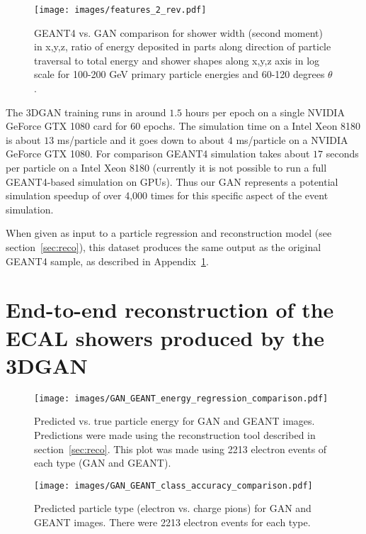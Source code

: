 \begin{figure}
    \centering
    \texttt{[image: images/features\_2\_rev.pdf]}
    \caption{GEANT4 vs. GAN comparison for shower width (second
      moment) in x,y,z, ratio of energy deposited in parts along
      direction of particle traversal to total energy and shower
      shapes along x,y,z axis in log scale for 100-200 GeV primary
      particle energies and 60-120 degrees $\theta$.
      \label{fig:GAN_features2}}
\end{figure}

The 3DGAN training runs in around $1.5$ hours per epoch on a single NVIDIA GeForce GTX 1080 card for $60$ epochs. The simulation  time  on a Intel  Xeon 8180  is about $13$ ms/particle  and it goes down to about $4$ ms/particle on a NVIDIA  GeForce  GTX  1080. For  comparison  GEANT4  simulation takes  about $17$ seconds  per  particle on  a  Intel  Xeon  8180 (currently  it  is  not  possible  to  run a full  GEANT4-based  simulation  on  GPUs). Thus our GAN represents a potential simulation speedup of over 4,000 times for this specific aspect of the event simulation.

When given as input to a particle regression and reconstruction model (see section~\ref{sec:reco}), this dataset produces the same output as the original GEANT4 sample, as described in Appendix~\ref{appendix:RECO_on_GAN}.

\section{End-to-end reconstruction of the ECAL showers produced by the 3DGAN}
\label{appendix:RECO_on_GAN}

\begin{figure}
    \centering
    \texttt{[image: images/GAN\_GEANT\_energy\_regression\_comparison.pdf]}
    \caption{Predicted vs. true particle energy for GAN and GEANT
      images. Predictions were made using the reconstruction tool described in section~\ref{sec:reco}. This plot was made using 2213 electron events of each type (GAN and GEANT).\label{fig:GAN_regression}}
\end{figure}

\begin{figure}
    \centering
    \texttt{[image: images/GAN\_GEANT\_class\_accuracy\_comparison.pdf]}
    \caption{Predicted particle type (electron vs. charge pions) for GAN and GEANT images. There were 2213 electron events for each
      type.\label{fig:GAN_classification}}
\end{figure}

